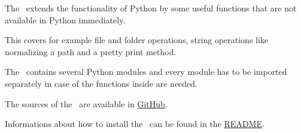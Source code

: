 %



%

The \pkg\ extends the functionality of Python by some useful functions that are not available in Python immediately.

This covers for example file and folder operations, string operations like normalizing a path and a pretty print method.

The \pkg\ contains several Python modules and every module has to be imported separately in case of
the functions inside are needed.

The sources of the \pkg\ are available in \href{https://github.com/test-fullautomation/python-extensions-collection}{GitHub}.

Informations about how to install the \pkg\ can be found in the \href{https://github.com/test-fullautomation/python-extensions-collection/blob/develop/README.rst}{README}.

